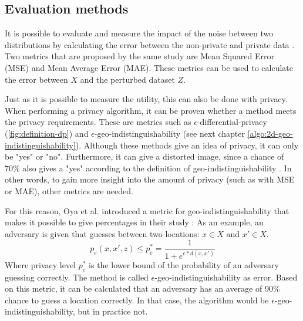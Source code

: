 \subsection{Evaluation methods} \label{theory:evaluation-dp}
It is possible to evaluate and measure the impact of the noise between two distributions by calculating the error between the non-private and private data \citep{del_rey_comprehensive_2020-1}.
Two metrics that are proposed by the same study are Mean Squared Error (MSE) and Mean Average Error (MAE).
These metrics can be used to calculate the error between $X$ and the perturbed dataset $Z$. \newline

Just as it is possible to measure the utility, this can also be done with privacy.
When performing a privacy algorithm, it can be proven whether a method meets the privacy requirements.
These are metrics such as $\epsilon$-differential-privacy (\ref{fig:definition-dp}) and $\epsilon$-geo-indistinguishability (see next chapter \ref{algo:2d-geo-indistinguishability}).
Although these methods give an idea of privacy, it can only be "yes" or "no".
Furthermore, it can give a distorted image, since a chance of 70\% also gives a "yes" according to the definition of geo-indistinguishability \citep{oya_is_2017}.
In other words, to gain more insight into the amount of privacy (such as with MSE or MAE), other metrics are needed.

For this reason, Oya et al. introduced a metric for geo-indistinguishability that makes it possible to give percentages in their study \citep{oya_is_2017}:
As an example, an adversary is given that guesses between two locations: $x \in X$ and  $x' \in X$.
\begin{equation}
  p_e (x, x', z) \leq p^*_e = \frac{1}{1 + e^{e * d(x, x')}}
  \label{eq:geo-as-an-error}
\end{equation}
Where privacy level $p^*_e$ is the lower bound of the probability of an adversary guessing correctly.
The method is called $\epsilon$-geo-indistinguishability as error.
Based on this metric, it can be calculated that an adversary has an average of 90\% chance to guess a location correctly.
In that case, the algorithm would be $\epsilon$-geo-indistinguishability, but in practice not.